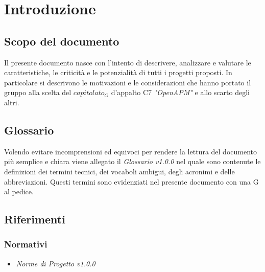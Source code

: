\section{Introduzione}
	\subsection{Scopo del documento}
	Il presente documento nasce con l'intento di descrivere, analizzare e valutare le caratteristiche, le criticità e le potenzialità di tutti i progetti proposti. In particolare si descrivono le motivazioni e le considerazioni che hanno portato il gruppo alla scelta del $capitolato_G$ d'appalto C7 \emph{"OpenAPM"} e allo scarto degli altri.
	\subsection{Glossario}
	Volendo evitare incomprensioni  ed equivoci per rendere la lettura del documento più semplice e chiara viene allegato il \emph{Glossario v1.0.0} nel quale sono contenute le definizioni dei termini tecnici, dei vocaboli ambigui, degli acronimi e delle abbreviazioni. Questi termini sono evidenziati nel presente documento con una G al pedice. 
	\subsection{Riferimenti}
		\subsubsection{Normativi}
		\begin{itemize}
			\item \emph{Norme di Progetto v1.0.0}
		\end{itemize}
		

